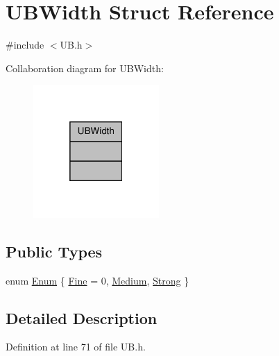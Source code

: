 \hypertarget{struct_u_b_width}{\section{U\-B\-Width Struct Reference}
\label{df/d79/struct_u_b_width}
}


{\ttfamily \#include $<$U\-B.\-h$>$}



Collaboration diagram for U\-B\-Width\-:
\nopagebreak
\begin{figure}[H]
\begin{center}
\leavevmode
\includegraphics[width=136pt]{d9/d52/struct_u_b_width__coll__graph}
\end{center}
\end{figure}
\subsection*{Public Types}
\begin{DoxyCompactItemize}
\item 
enum \hyperlink{struct_u_b_width_a1cdf36b8767130b4ff112ac3feadab67}{Enum} \{ \hyperlink{struct_u_b_width_a1cdf36b8767130b4ff112ac3feadab67abb43f940763e125812657ceb49ba64c9}{Fine} =  0, 
\hyperlink{struct_u_b_width_a1cdf36b8767130b4ff112ac3feadab67a41a30f282cc204fc5b8e55cc1398033d}{Medium}, 
\hyperlink{struct_u_b_width_a1cdf36b8767130b4ff112ac3feadab67a2cf69ae460a76f183280dbbd957d48af}{Strong}
 \}
\end{DoxyCompactItemize}


\subsection{Detailed Description}


Definition at line 71 of file U\-B.\-h.



